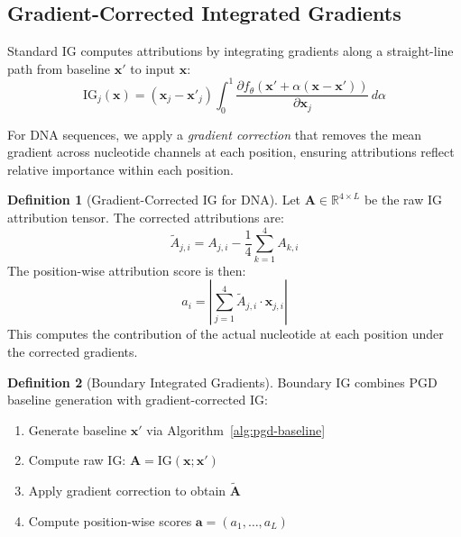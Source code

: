 \documentclass[11pt]{article}
\newcommand{\x}{\mathbf{x}}
\newcommand{\model}{f_\theta}
\newcommand{\R}{\mathbb{R}}
\theoremstyle{definition}
\newtheorem{definition}{Definition}
\begin{document}
\subsection{Gradient-Corrected Integrated Gradients}

Standard IG computes attributions by integrating gradients along a straight-line path from baseline $\x'$ to input $\x$:
\begin{equation}
    \text{IG}_j(\x) = (\x_j - \x'_j) \int_0^1 \frac{\partial \model(\x' + \alpha(\x - \x'))}{\partial \x_j} \, d\alpha
\end{equation}

For DNA sequences, we apply a \emph{gradient correction} that removes the mean gradient across nucleotide channels at each position, ensuring attributions reflect relative importance within each position.

\begin{definition}[Gradient-Corrected IG for DNA]
Let $\mathbf{A} \in \R^{4 \times L}$ be the raw IG attribution tensor. The corrected attributions are:
\begin{equation}
    \tilde{A}_{j,i} = A_{j,i} - \frac{1}{4}\sum_{k=1}^{4} A_{k,i}
\end{equation}
The position-wise attribution score is then:
\begin{equation}
    a_i = \left| \sum_{j=1}^{4} \tilde{A}_{j,i} \cdot \x_{j,i} \right|
\end{equation}
This computes the contribution of the actual nucleotide at each position under the corrected gradients.
\end{definition}

\begin{definition}[Boundary Integrated Gradients]
Boundary IG combines PGD baseline generation with gradient-corrected IG:
\begin{enumerate}
    \item Generate baseline $\x'$ via Algorithm~\ref{alg:pgd-baseline}
    \item Compute raw IG: $\mathbf{A} = \text{IG}(\x; \x')$
    \item Apply gradient correction to obtain $\tilde{\mathbf{A}}$
    \item Compute position-wise scores $\mathbf{a} = (a_1, \ldots, a_L)$
\end{enumerate}
\end{definition}

\end{document}
